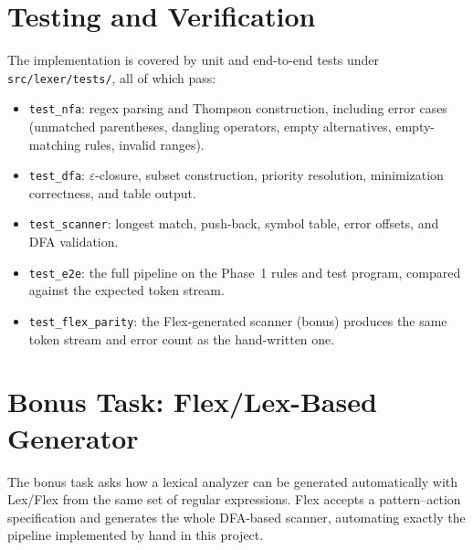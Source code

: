 \documentclass[11pt,a4paper]{article}
\begin{document}
\section{Testing and Verification}
The implementation is covered by unit and end-to-end tests under
\texttt{src/lexer/tests/}, all of which pass:
\begin{itemize}
    \item \texttt{test\_nfa}: regex parsing and Thompson construction, including
          error cases (unmatched parentheses, dangling operators, empty
          alternatives, empty-matching rules, invalid ranges).
    \item \texttt{test\_dfa}: $\varepsilon$-closure, subset construction,
          priority resolution, minimization correctness, and table output.
    \item \texttt{test\_scanner}: longest match, push-back, symbol table, error
          offsets, and DFA validation.
    \item \texttt{test\_e2e}: the full pipeline on the Phase~1 rules and test
          program, compared against the expected token stream.
    \item \texttt{test\_flex\_parity}: the Flex-generated scanner (bonus) produces
          the same token stream and error count as the hand-written one.
\end{itemize}

\section{Bonus Task: Flex/Lex-Based Generator}
The bonus task asks how a lexical analyzer can be generated automatically with
Lex/Flex from the same set of regular expressions. Flex accepts a
pattern--action specification and generates the whole DFA-based scanner,
automating exactly the pipeline implemented by hand in this project.
\end{document}
